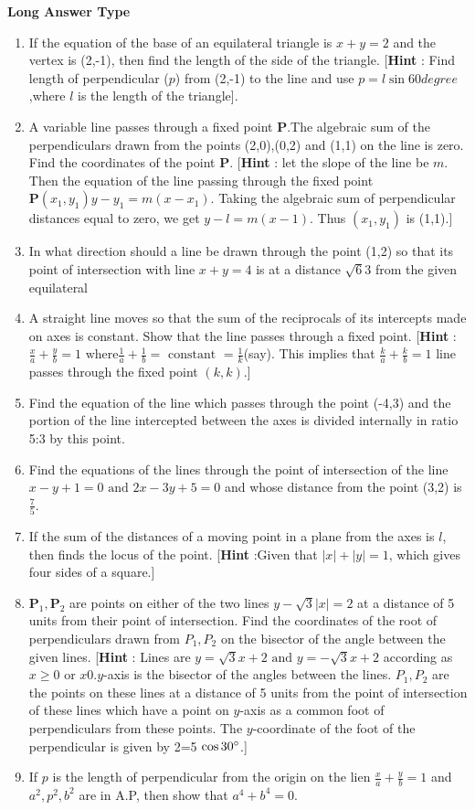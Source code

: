 \documentclass[12pt]{article}
\providecommand{\abs}[1]{\left\vert#1\right\vert}
\let\vec\mathbf
\begin{document}
 \textbf{Long Answer Type}
 \begin{enumerate}[resume]
\item If the equation of the base of an equilateral triangle is $x+y=2$ and the vertex is (2,-1), then find the length of the side of the triangle. 
[\textbf{Hint} : Find length of perpendicular ($p$) from (2,-1) to the line and use $p=l \sin 60degree$,where $l$ is the length of the triangle].
\item A variable line passes through a fixed point $\vec{P}$.The algebraic sum of the perpendiculars drawn from the points (2,0),(0,2) and (1,1) on the line is zero. Find the coordinates of the point $\vec{P}$.  
[\textbf{Hint} : let the slope of the line be $m$. Then the equation of the line passing through the fixed point $\vec{P}(x_1,y_1) y-y_1=m(x-x_1)$. Taking the algebraic sum of perpendicular distances equal to zero, we get $y-l=m(x-1)$. Thus $(x_1,y_1)$ is (1,1).]
\item In what direction should a line be drawn through the point (1,2) so that its point of intersection with line $x+y=4$ is at a distance $\sqrt{6}{3}$ from the given equilateral    
\item A straight line moves so that the sum of the reciprocals of its intercepts made on axes is constant. Show that the line passes through a fixed point. [\textbf{Hint} : $\frac{x}{a}+\frac{y}{b}=1\text{ where} \frac{1}{a}+\frac{1}{b}=\text{ constant }=\frac{1}{k}$(say). This implies that $\frac{k}{a}+\frac{k}{b}=1$ line passes through the fixed point $(k,k)$.]
\item Find the equation of the line which passes through the point (-4,3) and the portion of the line intercepted between the axes is divided internally in ratio 5:3 by this point.
\item Find the equations of the lines through the point of intersection of the line $x-y+1=0 \text{ and }2x-3y+5=0$ and whose distance from the point (3,2) is $\frac{7}{5}$.
\item If the sum of the distances of a moving point in a plane from the axes is $l$, then finds the locus of the point. [\textbf{Hint} :Given that $\abs{x}+\abs{y}=1$, which  gives four  sides of a square.] 
\item $\vec{P}_1,\vec{P}_2$ are points on either of the two lines $y-\sqrt{3}\abs{x}=2$ at a distance of 5 units from their point of intersection. Find the coordinates of the root of perpendiculars drawn from $P_1, P_2$ on the bisector of the angle between the given lines.
[\textbf{Hint} : Lines are $y=\sqrt{3}x+2 \text{ and }y=-\sqrt{3}x+2$ according as $x\geq0$ or $x0. y$-axis is the bisector of the angles between the lines. $P_1, P_2$ are the points on these lines at a distance of 5 units from the point of intersection of these lines which have a point on $y$-axis as a common foot of perpendiculars from these points. The $y$-coordinate of the foot of the perpendicular is given by 2=5 $\cos{30\degree}$.]
\item If $p$ is the length of perpendicular from the origin on the lien $\frac{x}{a}+\frac{y}{b}=1$ and $a^2,p^2,b^2$ are in A.P, then show that $a^4+b^4=0$.
\end{enumerate}
\end{document}
